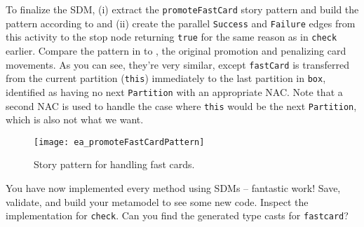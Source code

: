 \begin{stepbystep}
\item To finalize the SDM, (i) extract the \texttt{promoteFastCard} story pattern and build the pattern according to
 and (ii) create the parallel \texttt{Success} and \texttt{Failure} edges from this activity to the stop node returning 
\texttt{true} for the same reason as in \texttt{check} earlier.
Compare the pattern in  to , the original promotion and penalizing card movements.
As you can see, they're very similar, except \texttt{fastCard} is transferred from the current partition
(\texttt{this}) immediately to the last partition in \texttt{box}, identified as having no next \texttt{Partition} with an appropriate NAC.
Note that a second NAC is used to handle the case where \texttt{this} would be the next \texttt{Partition}, which is also not what we want.

\begin{figure}[htbp] 
\begin{center}
  \texttt{[image: ea\_promoteFastCardPattern]}
  \caption{Story pattern for handling fast cards.}  
  \label{ea:promoteFastCardPattern}
\end{center}
\end{figure}

\item You have now implemented every method using SDMs -- fantastic work! Save, validate, and build your metamodel to see some new code.
Inspect the implementation for \texttt{check}.  Can you find the generated type casts for \texttt{fastcard}?

\end{stepbystep}
